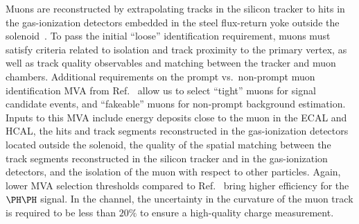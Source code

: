 Muons are reconstructed by extrapolating tracks in the silicon tracker to hits in the gas-ionization
detectors embedded in the steel flux-return yoke outside the solenoid~\cite{Sirunyan:2018}.
To pass the initial ``loose'' identification requirement, muons must satisfy criteria related to
isolation and track proximity to the primary vertex, as well as track quality observables and
matching between the tracker and muon chambers. %
Additional requirements on the prompt vs.\ non-prompt muon identification MVA from Ref.~\cite{Sirunyan:2020icl} allow
us to select ``tight'' muons for signal candidate events, and ``fakeable'' muons for non-prompt background estimation.
Inputs to this MVA include energy deposits close to the muon in the ECAL and HCAL,
the hits and track segments reconstructed in the gas-ionization detectors located outside the solenoid,
the quality of the spatial matching between the track segments reconstructed in the silicon tracker and in the gas-ionization detectors,
and the isolation of the muon with respect to other particles.
Again, lower MVA selection thresholds compared to Ref.~\cite{Sirunyan:2020icl} bring higher efficiency for the $\HH$ signal.
In the \twoLeptonssZeroTau channel, the uncertainty in the curvature of the muon track is required to be less than $20\%$
to ensure a high-quality charge measurement.

